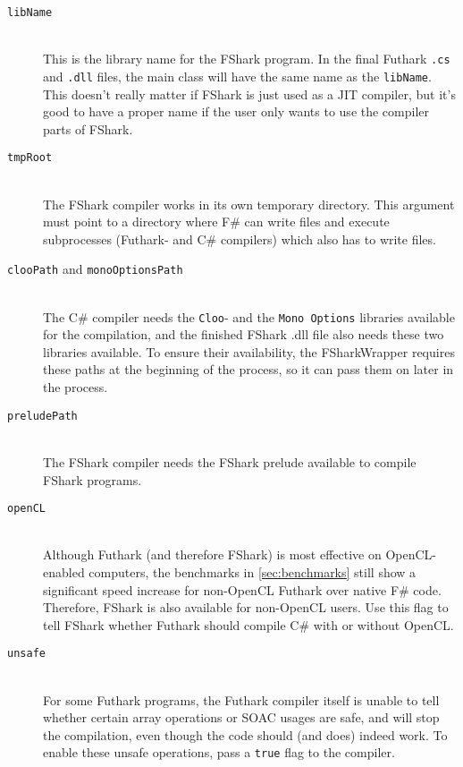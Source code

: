 \begin{description}
\item[\texttt{libName}]\hfill\\
  This is the library name for the FShark program. In the final Futhark
  \texttt{.cs} and \texttt{.dll} files, the main class will have the same name
  as the \texttt{libName}. This doesn't really matter if FShark is just used
  as a JIT compiler, but it's good to have a proper name if the user only wants
  to use the compiler parts of FShark.

\item[\texttt{tmpRoot}]\hfill\\
  The FShark compiler works in its own temporary directory. This argument must
  point to a directory where F\# can write files and execute subprocesses
  (Futhark- and C\# compilers) which also has to write files.
  
\item[\texttt{clooPath} and \texttt{monoOptionsPath}]\hfill\\
  The C\# compiler needs the \texttt{Cloo}- and the \texttt{Mono Options}
  libraries available for the compilation, and the finished FShark .dll file
  also needs these two libraries available. To ensure their availability, the
  FSharkWrapper requires these paths at the beginning of the process, so it can
  pass them on later in the process.

\item[\texttt{preludePath}]\hfill\\
  The FShark compiler needs the FShark prelude available to compile FShark
  programs. 

\item[\texttt{openCL}]\hfill\\
  Although Futhark (and therefore FShark) is most effective on OpenCL-enabled
  computers, the benchmarks in \ref{sec:benchmarks} still show a significant
  speed increase for non-OpenCL Futhark over native F\# code.
  Therefore, FShark is also available for non-OpenCL users. Use this flag to
  tell FShark whether Futhark should compile C\# with or without OpenCL.
  
\item[\texttt{unsafe}]\hfill\\
  For some Futhark programs, the Futhark compiler itself is unable to tell
  whether certain array operations or SOAC usages are safe, and will stop the
  compilation, even though the code should (and does) indeed work.
  To enable these unsafe operations, pass a \texttt{true} flag to the compiler.
\end{description}

